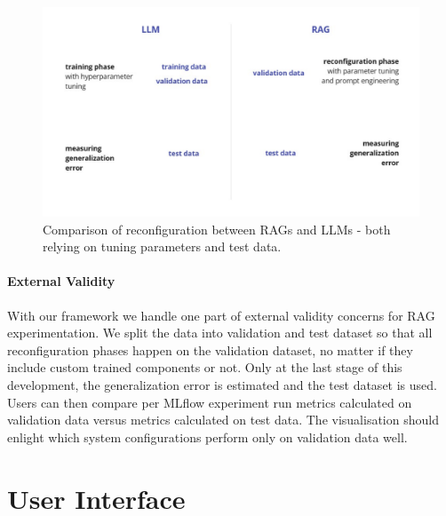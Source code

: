 \begin{figure}
    \centering
    \includegraphics[width=\textwidth]{images/RAGvsLLM-tuning.pdf}
    \caption{Comparison of reconfiguration between RAGs and LLMs - both relying on tuning parameters and test data.}
    \label{fig:tuning}
\end{figure}

\paragraph{External Validity}

With our framework we handle one part of external validity concerns for RAG experimentation. We split the data into validation and test dataset so that all reconfiguration phases happen on the validation dataset, no matter if they include custom trained components or not. Only at the last stage of this development, the generalization error is estimated and the test dataset is used. Users can then compare per MLflow experiment run metrics calculated on validation data versus metrics calculated on test data. The visualisation should enlight which system configurations perform only on validation data well. 

\section{User Interface}

